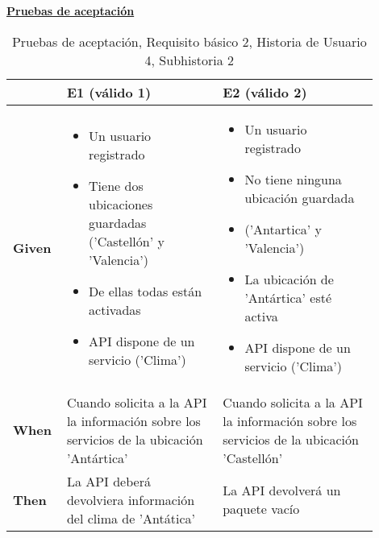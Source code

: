 \documentclass[../ei103948-project-documentation.tex]{subfiles}
\begin{document}
\begin{center}
						\textbf{\underline{Pruebas de aceptación}}
						\begin{table}[H]
							\centering
							\begin{tabular}{|p{0.10\linewidth}|p{0.40\linewidth}|p{0.40\linewidth}|}
								\hline
								\textbf{}      & \textbf{E1 (válido 1)}                                                                                                                                           & \textbf{E2 (válido 2)}                                                                                                                                           \\ \hline
								\textbf{Given} &
									\begin{itemize}\vspace{-5mm}\setlength\itemsep{0mm}\setlength\parskip{0mm}\setlength{\itemindent}{-5mm} 
										\item Un usuario registrado
										\item Tiene dos ubicaciones guardadas ('Castellón' y 'Valencia')
										\item De ellas todas están activadas
										\item API dispone de un servicio ('Clima')
									\end{itemize}& 
									\begin{itemize}\vspace{-5mm}\setlength\itemsep{0mm}\setlength\parskip{0mm}\setlength{\itemindent}{-5mm}
										\item Un usuario registrado
										\item No tiene ninguna ubicación guardada
										\item ('Antartica' y 'Valencia')
										\item La ubicación de 'Antártica' esté activa
										\item API dispone de un servicio ('Clima')
									\end{itemize}\\ \hline
								\textbf{When}  & Cuando solicita a la API la información sobre los servicios de la ubicación 'Antártica'                                                                        & Cuando solicita a la API la información sobre los servicios de la ubicación 'Castellón'                                                                          \\ \hline
								\textbf{Then}  & La API deberá devolviera información del clima de 'Antática'                                                                                                  & La API devolverá un paquete vacío                                                                                                                                \\ \hline
								\end{tabular}
							\caption{Pruebas de aceptación, Requisito básico 2, Historia de Usuario 4, Subhistoria 2}
						\end{table}
						\end{center}
\end{document}
